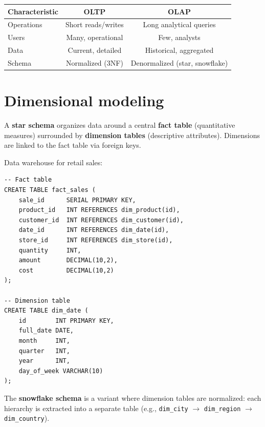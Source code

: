 \begin{center}
\begin{tabular}{lcc}
\hline
\textbf{Characteristic} & \textbf{OLTP} & \textbf{OLAP} \\
\hline
Operations & Short reads/writes & Long analytical queries \\
Users & Many, operational & Few, analysts \\
Data & Current, detailed & Historical, aggregated \\
Schema & Normalized (3NF) & Denormalized (star, snowflake) \\
\hline
\end{tabular}
\end{center}

\section{Dimensional modeling}

\begin{definition}
A \textbf{star schema} organizes data around a central \textbf{fact table}
(quantitative measures) surrounded by \textbf{dimension tables}
(descriptive attributes). Dimensions are linked to the fact table via
foreign keys.
\end{definition}

\begin{example}
Data warehouse for retail sales:
\begin{verbatim}
-- Fact table
CREATE TABLE fact_sales (
    sale_id      SERIAL PRIMARY KEY,
    product_id   INT REFERENCES dim_product(id),
    customer_id  INT REFERENCES dim_customer(id),
    date_id      INT REFERENCES dim_date(id),
    store_id     INT REFERENCES dim_store(id),
    quantity     INT,
    amount       DECIMAL(10,2),
    cost         DECIMAL(10,2)
);

-- Dimension table
CREATE TABLE dim_date (
    id        INT PRIMARY KEY,
    full_date DATE,
    month     INT,
    quarter   INT,
    year      INT,
    day_of_week VARCHAR(10)
);
\end{verbatim}
\end{example}

\begin{definition}
The \textbf{snowflake schema} is a variant where dimension tables are
normalized: each hierarchy is extracted into a separate table
(e.g., \texttt{dim\_city} $\to$ \texttt{dim\_region} $\to$
\texttt{dim\_country}).
\end{definition}

